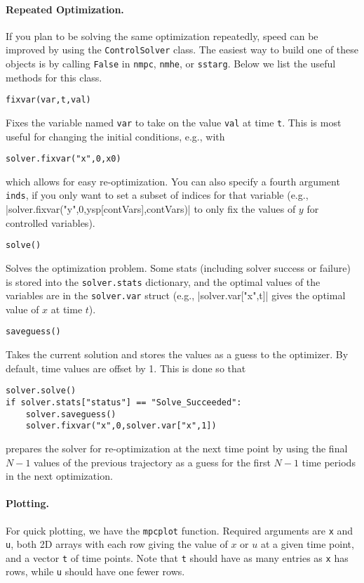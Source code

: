 \documentclass{article}
\providecommand{\lstinline}{}
\newcommand{\funcname}[2][.25em]{\vspace{#1}\noindent\texttt{#2}\nopagebreak\vspace{#1}}
\begin{document}
\begin{multicols}{2}
\paragraph*{Repeated Optimization.}

If you plan to be solving the same optimization repeatedly, speed can be improved by using the \texttt{ControlSolver} class.
The easiest way to build one of these objects is by calling \texttt{False} in \texttt{nmpc}, \texttt{nmhe}, or \texttt{sstarg}.
Below we list the useful methods for this class.

\funcname{fixvar(var,t,val)}

Fixes the variable named \texttt{var} to take on the value \texttt{val} at time \texttt{t}.
This is most useful for changing the initial conditions, e.g., with
%
\begin{lstlisting}[frame=L]
solver.fixvar("x",0,x0)
\end{lstlisting}
%
which allows for easy re-optimization.
You can also specify a fourth argument \texttt{inds}, if you only want to set a subset of indices for that variable (e.g., \lstinline|solver.fixvar("y",0,ysp[contVars],contVars)| to only fix the values of $y$ for controlled variables).

\funcname{solve()}

Solves the optimization problem.
Some stats (including solver success or failure) is stored into the \texttt{solver.stats} dictionary, and the optimal values of the variables are in the \texttt{solver.var} struct (e.g., \lstinline|solver.var["x",t]| gives the optimal value of $x$ at time $t$).

\funcname{saveguess()}

Takes the current solution and stores the values as a guess to the optimizer.
By default, time values are offset by 1. This is done so that
%
\begin{lstlisting}[frame=L]
solver.solve()
if solver.stats["status"] == "Solve_Succeeded":
    solver.saveguess()
    solver.fixvar("x",0,solver.var["x",1])
\end{lstlisting}
%
prepares the solver for re-optimization at the next time point by using the final $N-1$ values of the previous trajectory as a guess for the first $N-1$ time periods in the next optimization.

\paragraph{Plotting.}

For quick plotting, we have the \texttt{mpcplot} function.
Required arguments are \texttt{x} and \texttt{u}, both 2D arrays with each row giving the value of $x$ or $u$ at a given time point, and a vector \texttt{t} of time points.
Note that \texttt{t} should have as many entries as \texttt{x} has rows, while \texttt{u} should have one fewer rows.


\end{multicols}
\end{document}
